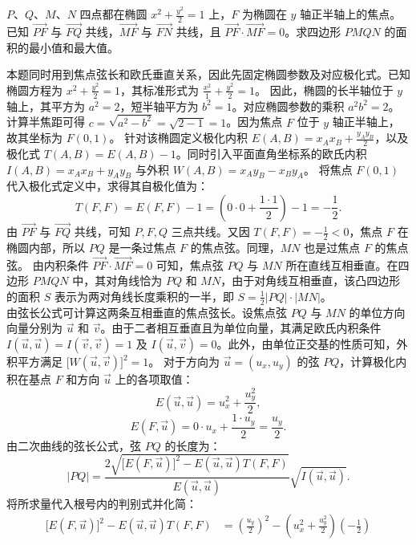 \begin{example}
\(P\)、\(Q\)、\(M\)、\(N\) 四点都在椭圆 \(x^2 + \frac{y^2}{2} = 1\) 上，\(F\) 为椭圆在 \(y\) 轴正半轴上的焦点。已知 \(\overrightarrow{PF}\) 与 \(\overrightarrow{FQ}\) 共线，\(\overrightarrow{MF}\) 与 \(\overrightarrow{FN}\) 共线，且 \(\overrightarrow{PF} \cdot \overrightarrow{MF} = 0\)。求四边形 \(PMQN\) 的面积的最小值和最大值。
\end{example}
\begin{solution}
本题同时用到焦点弦长和欧氏垂直关系，因此先固定椭圆参数及对应极化式。已知椭圆方程为 $x^2+\frac{y^2}{2}=1$，其标准形式为 $\frac{x^2}{1}+\frac{y^2}{2}=1$。
因此，椭圆的长半轴位于 $y$ 轴上，其平方为 $a^2 = 2$，短半轴平方为 $b^2 = 1$。对应椭圆参数的乘积 $a^2 b^2 = 2$。计算半焦距可得 $c = \sqrt{a^2 - b^2} = \sqrt{2 - 1} = 1$。因为焦点 $F$ 位于 $y$ 轴正半轴上，故其坐标为 $F(0, 1)$。
针对该椭圆定义极化内积 $E(A, B) = x_A x_B + \frac{y_A y_B}{2}$，以及极化式 $T(A, B) = E(A, B) - 1$。同时引入平面直角坐标系的欧氏内积 $I(A, B) = x_A x_B + y_A y_B$ 与外积 $W(A, B) = x_A y_B - x_B y_A$。
将焦点 $F(0, 1)$ 代入极化式定义中，求得其自极化值为：
\[ T(F, F) = E(F, F) - 1 = \left(0 \cdot 0 + \frac{1 \cdot 1}{2}\right) - 1 = -\frac{1}{2}. \]
由 $\overrightarrow{PF}$ 与 $\overrightarrow{FQ}$ 共线，可知 $P,F,Q$ 三点共线。又因 $T(F, F) = -\frac{1}{2} < 0$，焦点 $F$ 在椭圆内部，所以 $PQ$ 是一条过焦点 $F$ 的焦点弦。同理，$MN$ 也是过焦点 $F$ 的焦点弦。
由内积条件 $\overrightarrow{PF} \cdot \overrightarrow{MF} = 0$ 可知，焦点弦 $PQ$ 与 $MN$ 所在直线互相垂直。在四边形 $PMQN$ 中，其对角线恰为 $PQ$ 和 $MN$，由于对角线互相垂直，该凸四边形的面积 $S$ 表示为两对角线长度乘积的一半，即 $S = \frac{1}{2} |PQ| \cdot |MN|$。\\
由弦长公式可计算这两条互相垂直的焦点弦长。设焦点弦 $PQ$ 与 $MN$ 的单位方向向量分别为 $\vec{u}$ 和 $\vec{v}$。由于二者相互垂直且为单位向量，其满足欧氏内积条件 $I(\vec{u}, \vec{u}) = I(\vec{v}, \vec{v}) = 1$ 及 $I(\vec{u}, \vec{v}) = 0$。此外，由单位正交基的性质可知，外积平方满足 $\big[W(\vec{u}, \vec{v})\big]^2 = 1$。
对于方向为 $\vec{u} = (u_x, u_y)$ 的弦 $PQ$，计算极化内积在基点 $F$ 和方向 $\vec{u}$ 上的各项取值：
\[ E(\vec{u}, \vec{u}) = u_x^2 + \frac{u_y^2}{2}, \]
\[ E(F, \vec{u}) = 0 \cdot u_x + \frac{1 \cdot u_y}{2} = \frac{u_y}{2}. \]
由二次曲线的弦长公式，弦 $PQ$ 的长度为：
\[ |PQ| = \frac{2\sqrt{\big[E(F, \vec{u})\big]^2 - E(\vec{u}, \vec{u})T(F, F)}}{E(\vec{u}, \vec{u})} \sqrt{I(\vec{u}, \vec{u})}. \]
将所求量代入根号内的判别式并化简：
\begin{align*}
\big[E(F, \vec{u})\big]^2 - E(\vec{u}, \vec{u})T(F, F) &= \left(\frac{u_y}{2}\right)^2 - \left(u_x^2 + \frac{u_y^2}{2}\right)\left(-\frac{1}{2}\right) \\

\end{align*}
\end{solution}
